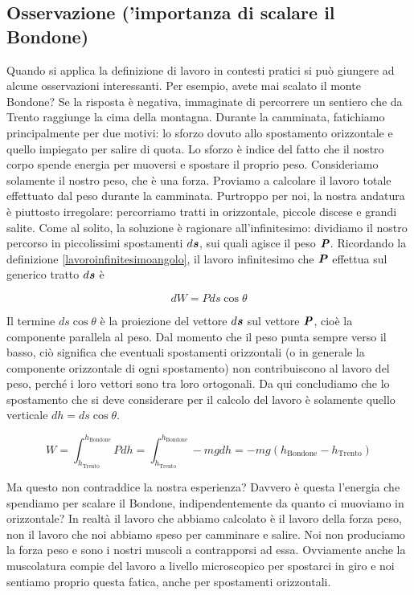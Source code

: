 \subsection*{Osservazione ('importanza di scalare il Bondone)}
Quando si applica la definizione di lavoro in contesti pratici si può
giungere ad alcune osservazioni interessanti. Per esempio, avete mai
scalato il monte Bondone? Se la risposta è negativa, immaginate di
percorrere un sentiero che da Trento raggiunge la cima della montagna.
Durante la camminata, fatichiamo principalmente per due motivi: lo
sforzo dovuto allo spostamento orizzontale e quello impiegato per
salire di quota. Lo sforzo è indice del fatto che il nostro corpo
spende energia per muoversi e spostare il proprio peso. Consideriamo
solamente il nostro peso, che è una forza. Proviamo a calcolare il
lavoro totale effettuato dal peso durante la camminata.
Purtroppo per noi, la nostra andatura è piuttosto irregolare:
percorriamo tratti in orizzontale, piccole discese e grandi
salite. Come al solito, la soluzione è ragionare all'infinitesimo:
dividiamo il nostro percorso in piccolissimi spostamenti $d\textbf{\textit{s}}$,
sui quali agisce il peso $\textbf{\textit{P}}$. Ricordando la definizione
\ref{lavoroinfinitesimoangolo}, il lavoro infinitesimo che $\textbf{\textit{P}}$
effettua sul generico tratto $d\textbf{\textit{s}}$ è

\[ dW = P ds \cos\theta \]

\noindent Il termine $ds \cos\theta$ è la proiezione del vettore
$d\textbf{\textit{s}}$ sul vettore $\textbf{\textit{P}}$, cioè la componente
parallela al peso. Dal momento che il peso punta sempre verso il
basso, ciò significa che eventuali spostamenti orizzontali (o in
generale la componente orizzontale di ogni spostamento) non
contribuiscono al lavoro del peso, perché i loro vettori sono
tra loro ortogonali. Da qui concludiamo che lo spostamento
che si deve considerare per il calcolo del lavoro è solamente
quello verticale $dh = ds \cos\theta$.

\[ W = \int_{h_\text{Trento}}^{h_\text{Bondone}} Pdh = \int_{h_\text{Trento}}^{h_\text{Bondone}} -mg dh = -mg(h_\text{Bondone} - h_\text{Trento}) \]

Ma questo non contraddice la nostra esperienza? Davvero è
questa l'energia che spendiamo per scalare il Bondone,
indipendentemente da quanto ci muoviamo in orizzontale? In realtà
il lavoro che abbiamo calcolato è il lavoro della forza peso, non
il lavoro che noi abbiamo speso per camminare e salire. Noi non
produciamo la forza peso e sono i nostri muscoli a contrapporsi
ad essa. Ovviamente anche la muscolatura compie del lavoro a livello
microscopico per spostarci in giro e noi sentiamo proprio questa fatica, anche
per spostamenti orizzontali.

